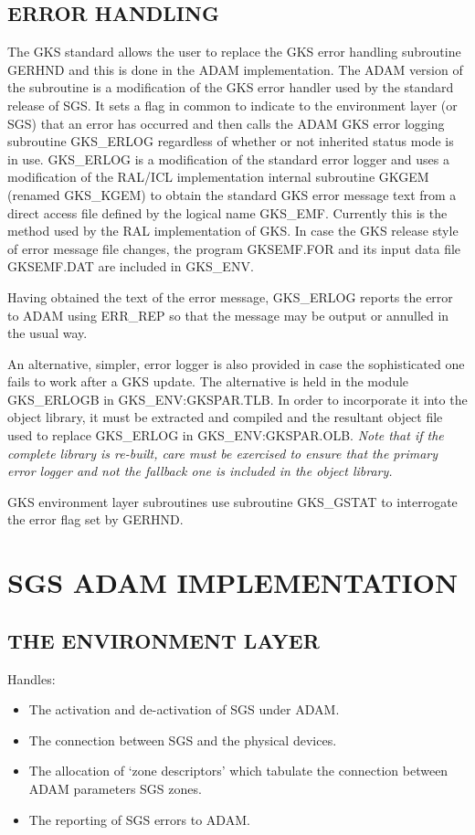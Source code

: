 \subsection{ERROR HANDLING}
The GKS standard allows the user to replace the GKS error handling subroutine
GERHND and this is done in the ADAM implementation. The ADAM version of the
subroutine is a modification of the GKS error handler used by
the standard release of SGS.
It sets a flag in common to indicate to the environment layer (or SGS) that
an error has occurred
and then calls the ADAM GKS error logging subroutine GKS\_ERLOG regardless
of whether or not inherited status mode is in use.
GKS\_ERLOG is a modification of the standard error logger and uses a 
modification of the RAL/ICL implementation internal subroutine GKGEM 
(renamed GKS\_KGEM) to obtain the standard GKS error message text from a 
direct access file defined by the logical name GKS\_EMF. 
Currently this is the method used by the RAL
implementation of GKS.
In case the GKS release style of error message file changes, the program
GKSEMF.FOR and its input data file GKSEMF.DAT are included in GKS\_ENV. 

Having obtained the text of the error message, GKS\_ERLOG reports the error
to ADAM using ERR\_REP so that the message may be output or annulled in the
usual way.

An alternative, simpler, error logger is also provided in case the sophisticated
one fails to work after a GKS update.
The alternative is held in the module GKS\_ERLOGB in GKS\_ENV:GKSPAR.TLB.
In order to incorporate it into the object library, it must be extracted and
compiled and the resultant object file used to replace GKS\_ERLOG in
GKS\_ENV:GKSPAR.OLB.
{\em Note that if the complete library is re-built, care must be exercised to 
ensure that the primary error logger and not the fallback one is included in 
the object library.}

GKS environment layer subroutines use subroutine GKS\_GSTAT to interrogate
the error flag set by GERHND.   

\section{SGS ADAM IMPLEMENTATION}

\subsection{THE ENVIRONMENT LAYER}
Handles:
\begin{itemize}
\item The activation and de-activation of SGS under ADAM.
\item The connection between SGS and the physical devices.
\item The allocation of `zone descriptors' which tabulate the connection 
between ADAM parameters SGS zones.
\item The reporting of SGS errors to ADAM.
\end{itemize}

